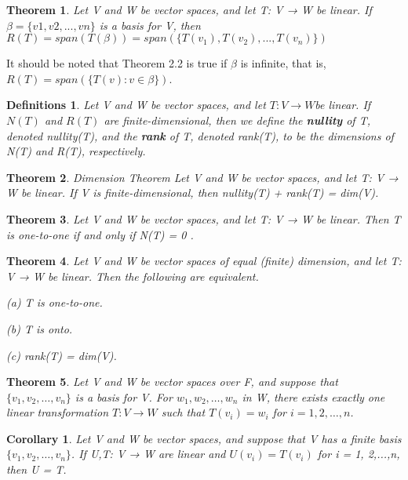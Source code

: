 \documentclass{article}
\newcommand{\bd}[1]{\textbf{#1}}
\theoremstyle{plain}
\newtheorem{theorem}{Theorem}[section]
\newtheorem*{corollary}{Corollary}
\newtheorem*{definitions}{Definitions}
\theoremstyle{plain} %
\begin{document}
\begin{theorem}
Let V and W be vector spaces, and let T: V → W be linear. If $\beta = \{v1, v2,...,vn\}$ is a basis for V, then $R(T) = span(T(\beta)) = span(\{T(v_1),T(v_2),...,T(v_n)\})$
\end{theorem}

It should be noted that Theorem 2.2 is true if $\beta$ is infinite, that is, $R(T) = span(\{T(v): v \in \beta\})$.

\begin{definitions}
Let V and W be vector spaces, and let $T: V \to W $be linear. If $N(T)$ and $R(T)$ are finite-dimensional, then we define the \bd{nullity} of T, denoted nullity(T), and the \bd{rank} of T, denoted rank(T), to be the dimensions of N(T) and R(T), respectively.
\end{definitions}

\begin{theorem}{Dimension Theorem}
Let V and W be vector spaces, and let T: V → W be linear. If V is finite-dimensional, then nullity(T) + rank(T) = dim(V).
\end{theorem}

\begin{theorem}
Let V and W be vector spaces, and let T: V → W be linear. Then T is one-to-one if and only if N(T) = {0 }.
\end{theorem}

\begin{theorem}
Let V and W be vector spaces of equal (finite) dimension, and let T: V → W be linear. Then the following are equivalent.

(a) T is one-to-one.

(b) T is onto.

(c) rank(T) = dim(V).
\end{theorem}

\begin{theorem}
Let V and W be vector spaces over F, and suppose that $\{v_1, v_2,\ldots,v_n\}$ is a basis for V. For $w_1, w_2,\ldots,w_n$ in W, there exists exactly one linear transformation $T: V \to W$ such that $T(v_i) = w_i$ for $i = 1, 2,\ldots, n$.
\end{theorem}

\begin{corollary}
Let V and W be vector spaces, and suppose that V has a finite basis $\{v_1, v_2,\ldots,v_n\}$. If U,T: V → W are linear and $U(v_i) = T(v_i)$ for i = 1, 2,...,n, then U = T.
\end{corollary}
\end{document}
